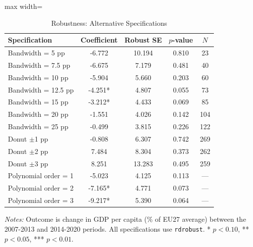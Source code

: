 \begin{table}[htbp]
\centering
\caption{Robustness: Alternative Specifications}
\label{tab:robustness}
\begin{adjustbox}{max width=\textwidth}
\begin{tabular}{lcccc}
\hline\hline
Specification & Coefficient & Robust SE & $p$-value & $N$ \\
\hline
Bandwidth = 5 pp & -6.772 & 10.194 & 0.810 & 23 \\
Bandwidth = 7.5 pp & -6.675 & 7.179 & 0.481 & 40 \\
Bandwidth = 10 pp & -5.904 & 5.660 & 0.203 & 60 \\
Bandwidth = 12.5 pp & -4.251* & 4.807 & 0.055 & 73 \\
Bandwidth = 15 pp & -3.212* & 4.433 & 0.069 & 85 \\
Bandwidth = 20 pp & -1.551 & 4.026 & 0.142 & 104 \\
Bandwidth = 25 pp & -0.499 & 3.815 & 0.226 & 122 \\
Donut $\pm$1 pp & -0.808 & 6.307 & 0.742 & 269 \\
Donut $\pm$2 pp & 7.484 & 8.304 & 0.373 & 262 \\
Donut $\pm$3 pp & 8.251 & 13.283 & 0.495 & 259 \\
Polynomial order = 1 & -5.023 & 4.125 & 0.113 & --- \\
Polynomial order = 2 & -7.165* & 4.771 & 0.073 & --- \\
Polynomial order = 3 & -9.217* & 5.390 & 0.064 & --- \\
\hline\hline
\end{tabular}
\end{adjustbox}
\begin{tablenotes}[flushleft]\small
\item \textit{Notes:} Outcome is change in GDP per capita (\% of EU27 average) between the 2007-2013 and 2014-2020 periods. All specifications use \texttt{rdrobust}. * $p < 0.10$, ** $p < 0.05$, *** $p < 0.01$.
\end{tablenotes}
\end{table}

